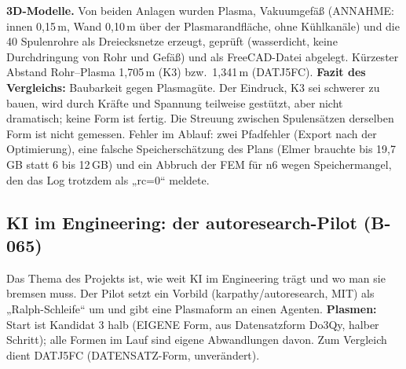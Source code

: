 \textbf{3D-Modelle.} Von beiden Anlagen wurden Plasma, Vakuumgefäß (ANNAHME: innen 0,15\,m, Wand 0,10\,m über der Plasmarandfläche, ohne Kühlkanäle) und die 40 Spulenrohre als Dreiecksnetze erzeugt, geprüft (wasserdicht, keine Durchdringung von Rohr und Gefäß) und als FreeCAD-Datei abgelegt.
Kürzester Abstand Rohr--Plasma 1,705\,m (K3) bzw.\ 1,341\,m (DATJ5FC).
\textbf{Fazit des Vergleichs:} Baubarkeit gegen Plasmagüte. Der Eindruck, K3 sei schwerer zu bauen, wird durch Kräfte und Spannung teilweise gestützt, aber nicht dramatisch; keine Form ist fertig. Die Streuung zwischen Spulensätzen derselben Form ist nicht gemessen. Fehler im Ablauf: zwei Pfadfehler (Export nach der Optimierung), eine falsche Speicherschätzung des Plans
(Elmer brauchte bis 19,7\,GB statt 6 bis 12\,GB) und ein Abbruch der FEM für n6 wegen Speichermangel, den das Log trotzdem als „rc=0“ meldete.

\subsection{KI im Engineering: der autoresearch-Pilot (B-065)}\label{sec:autoresearch}
Das Thema des Projekts ist, wie weit KI im Engineering trägt und wo man sie bremsen muss. Der Pilot setzt ein Vorbild (karpathy/autoresearch, MIT) als „Ralph-Schleife“ um und gibt eine Plasmaform an einen Agenten.
\textbf{Plasmen:} Start ist Kandidat 3 halb (EIGENE Form, aus Datensatzform Do3Qy, halber Schritt); alle Formen im Lauf sind eigene Abwandlungen davon. Zum Vergleich dient DATJ5FC (DATENSATZ-Form, unverändert).

